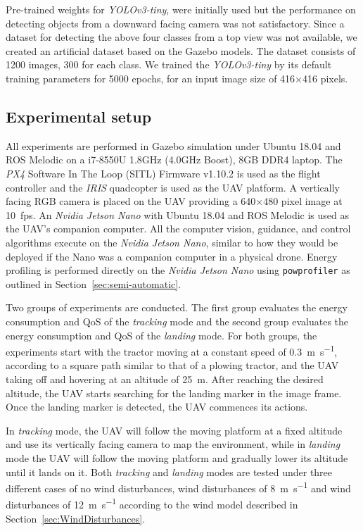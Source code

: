 \documentclass[conference, onecolumn, draftclsnofoot]{IEEEtran}
\newcommand{\stt}[1]{{\small\tt #1}} %
\newcommand{\powprof}{\stt{powprofiler}}
\begin{document}
Pre-trained weights for \emph{YOLOv3-tiny}, were initially used but the
performance on detecting objects from a downward facing camera was
not satisfactory. Since a dataset for detecting the above four classes
from a top view was not available, we created an artificial dataset
based on the Gazebo models. The dataset consists of 1200 images, 300
for each class. We trained the \emph{YOLOv3-tiny} by its default training
parameters for 5000 epochs, for an input image size of 416$\times$416
pixels.


\subsection{Experimental setup}

All experiments are performed in Gazebo simulation under Ubuntu 18.04
and ROS Melodic on a i7-8550U 1.8GHz (4.0GHz Boost), 8GB DDR4
laptop. The \emph{PX4} Software In The Loop (SITL) Firmware v1.10.2 is used as the flight
controller and the \emph{IRIS} quadcopter is used as the UAV platform. A
vertically facing RGB camera is placed on the UAV providing a
640$\times$480 pixel image at 10~fps. An \emph{Nvidia Jetson Nano}
with Ubuntu 18.04 and ROS Melodic is used as the UAV's companion
computer. All the computer vision, guidance, and control algorithms 
execute on the \emph{Nvidia Jetson Nano}, similar to how they would
be deployed if the Nano was a companion computer in a physical drone.
%
Energy profiling is performed directly on the \emph{Nvidia Jetson
  Nano} using \powprof{} as outlined in Section~\ref{sec:semi-automatic}.

Two groups of experiments are conducted. The first group evaluates the
energy consumption and QoS of the \emph{tracking} mode and the second group
evaluates the energy consumption and QoS of the \emph{landing} mode. For
both groups, the experiments start with the tractor moving at a
constant speed of \SI{0.3}{\meter\per\second}, according to a square path similar to that of a
plowing tractor, and the UAV taking off and hovering at an altitude of
\SI{25}{\meter}. After reaching the desired altitude, the UAV starts searching
for the landing marker in the image frame. Once the landing marker is
detected, the UAV commences its actions.

In \emph{tracking} mode, the UAV will follow the moving platform at a fixed
altitude and use its vertically facing camera to map the environment,
while in \emph{landing} mode the UAV will follow the moving platform and
gradually lower its altitude until it lands on it. Both \emph{tracking} and
\emph{landing} modes are tested under three different cases of no wind
disturbances, wind disturbances of \SI{8}{\meter \per \second} and wind disturbances of
\SI{12}{\meter \per \second} according to the wind model described in Section~\ref{sec:WindDisturbances}.
\end{document}
